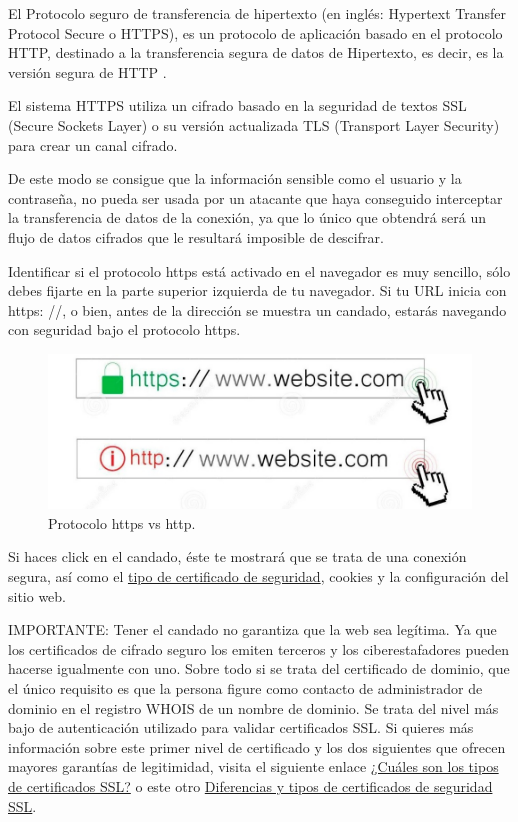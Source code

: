\documentclass[
  a4paper,
  openany]{book}
\begin{document}
El Protocolo seguro de transferencia de hipertexto (en inglés: Hypertext Transfer Protocol Secure o HTTPS), es un protocolo de aplicación basado en el protocolo HTTP, destinado a la transferencia segura de datos de Hipertexto, es decir, es la versión segura de HTTP \citep{WIKI-https}.

El sistema HTTPS utiliza un cifrado basado en la seguridad de textos SSL (Secure Sockets Layer) o su versión actualizada TLS (Transport Layer Security) para crear un canal cifrado.

De este modo se consigue que la información sensible como el usuario y la contraseña, no pueda ser usada por un atacante que haya conseguido interceptar la transferencia de datos de la conexión, ya que lo único que obtendrá será un flujo de datos cifrados que le resultará imposible de descifrar.

Identificar si el protocolo https está activado en el navegador es muy sencillo, sólo debes fijarte en la parte superior izquierda de tu navegador. Si tu URL inicia con https: //, o bien, antes de la dirección se muestra un candado, estarás navegando con seguridad bajo el protocolo https.

\begin{figure}

{\centering \includegraphics[width=0.75\linewidth]{images/protocolo-https-http} 

}

\caption{Protocolo https vs http.}\label{fig:unnamed-chunk-10}
\end{figure}

Si haces click en el candado, éste te mostrará que se trata de una conexión segura, así como el \href{https://www.softrending.com/blog/hosting/tipos-diferencias-certificado-seguridad-ssl}{tipo de certificado de seguridad}, cookies y la configuración del sitio web.

IMPORTANTE: Tener el candado no garantiza que la web sea legítima. Ya que los certificados de cifrado seguro los emiten terceros y los ciberestafadores pueden hacerse igualmente con uno. Sobre todo si se trata del certificado de dominio, que el único requisito es que la persona figure como contacto de administrador de dominio en el registro WHOIS de un nombre de dominio. Se trata del nivel más bajo de autenticación utilizado para validar certificados SSL. Si quieres más información sobre este primer nivel de certificado y los dos siguientes que ofrecen mayores garantías de legitimidad, visita el siguiente enlace
\href{https://www.globalsign.com/es/centro-de-informacion-ssl/tipos-de-certificados-ssl}{¿Cuáles son los tipos de certificados SSL?} o este otro \href{https://www.softrending.com/blog/tipos-diferencias-certificado-seguridad-ssl}{Diferencias y tipos de certificados de seguridad SSL}.
\end{document}

